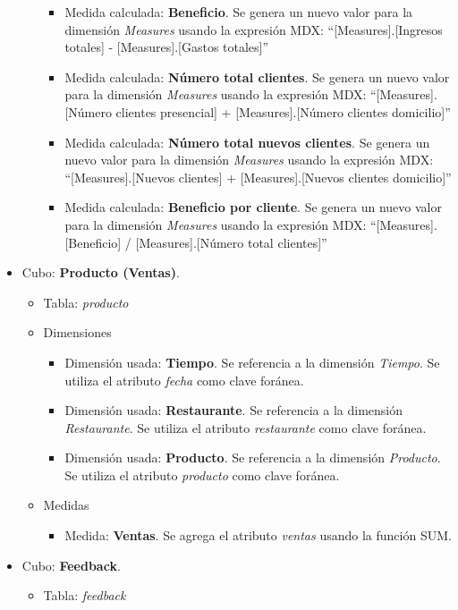 \documentclass[11pt]{opticajnl}
\begin{document}
\begin{itemize}
\begin{itemize}
\begin{itemize}
\item Medida calculada: \textbf{Beneficio}. Se genera un nuevo valor para la dimensión \textit{Measures} usando la expresión MDX: ``[Measures].[Ingresos totales] - [Measures].[Gastos totales]''
\item Medida calculada: \textbf{Número total clientes}. Se genera un nuevo valor para la dimensión \textit{Measures} usando la expresión MDX: ``[Measures].[Número clientes presencial] + [Measures].[Número clientes domicilio]''
\item Medida calculada: \textbf{Número total nuevos clientes}. Se genera un nuevo valor para la dimensión \textit{Measures} usando la expresión MDX: ``[Measures].[Nuevos clientes] + [Measures].[Nuevos clientes domicilio]''
\item Medida calculada: \textbf{Beneficio por cliente}. Se genera un nuevo valor para la dimensión \textit{Measures} usando la expresión MDX: ``[Measures].[Beneficio] / [Measures].[Número total clientes]''
\end{itemize}
\end{itemize}
\item Cubo: \textbf{Producto (Ventas)}.
\begin{itemize}
\item Tabla: \textit{producto}
\item Dimensiones
\begin{itemize}
\item Dimensión usada: \textbf{Tiempo}. Se referencia a la dimensión \textit{Tiempo}. Se utiliza el atributo \textit{fecha} como clave foránea.
\item Dimensión usada: \textbf{Restaurante}. Se referencia a la dimensión \textit{Restaurante}. Se utiliza el atributo \textit{restaurante} como clave foránea.
\item Dimensión usada: \textbf{Producto}. Se referencia a la dimensión \textit{Producto}. Se utiliza el atributo \textit{producto} como clave foránea.
\end{itemize}
\item Medidas
\begin{itemize}
\item Medida: \textbf{Ventas}. Se agrega el atributo \textit{ventas} usando la función SUM.
\end{itemize}
\end{itemize}
\item Cubo: \textbf{Feedback}.
\begin{itemize}
\item Tabla: \textit{feedback}

\end{itemize}
\end{itemize}
\end{document}
